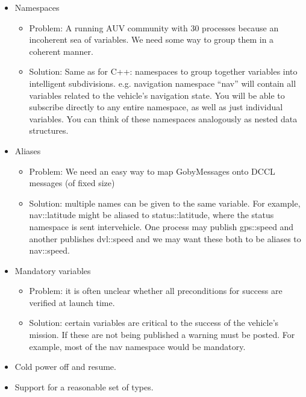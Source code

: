 \documentclass[10pt,letterpaper]{article}
\begin{document}
\begin{itemize}
\item Namespaces
\begin{itemize}
\item Problem: A running AUV community with 30 processes because an incoherent sea of variables. We need some way to group them in a coherent manner.
\item Solution: Same as for C++: namespaces to group together variables into intelligent subdivisions. e.g. navigation namespace ``nav'' will contain all variables related to the vehicle's navigation state. You will be able to subscribe directly to any entire namespace, as well as just individual variables. You can think of these namespaces analogously as nested data structures.
\end{itemize}
\item Aliases
\begin{itemize}
\item Problem: We need an easy way to map GobyMessages onto DCCL messages (of fixed size)
\item Solution: multiple names can be given to the same variable. For example, nav::latitude might be aliased to status::latitude, where the status namespace is sent intervehicle. One process may publish gps::speed and another publishes dvl::speed and we may want these both to be aliases to nav::speed. 
\end{itemize}
\item Mandatory variables
\begin{itemize}
\item Problem: it is often unclear whether all preconditions for success are verified at launch time.
\item Solution: certain variables are critical to the success of the vehicle's mission. If these are not being published a warning must be posted. For example, most of the nav namespace would be mandatory.
\end{itemize}
\item Cold power off and resume.
\item Support for a reasonable set of types.
\end{itemize}
\end{document}
